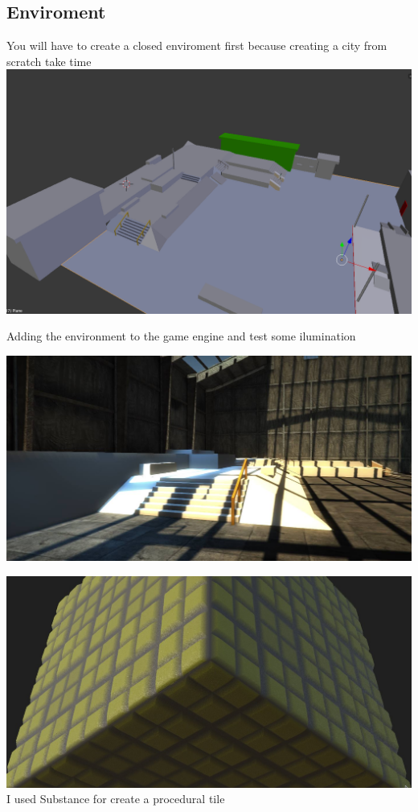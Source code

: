 \documentclass{article}
\begin{document}
  \subsection{Enviroment}
  You will have to create a closed enviroment first because creating a city from scratch take time 
  \includegraphics[width=\textwidth]{25.png}
  
  Adding the environment to the game engine and test some ilumination

  \includegraphics[width=\textwidth]{26.jpg}
  
  \includegraphics[width=\textwidth]{39.jpg}
  I used Substance for create a procedural tile
  
\end{document}

